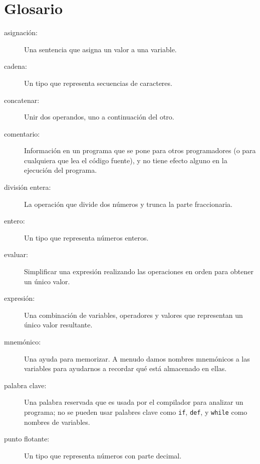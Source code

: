 

\section{Glosario}

\begin{description}

\item[asignación:]  Una sentencia que asigna un valor a una variable.

\item[cadena:] Un tipo que representa secuencias de caracteres.

\item[concatenar:]  Unir dos operandos, uno a continuación del otro.

\item[comentario:]  Información en un programa que se pone para otros
programadores (o para cualquiera que lea el código fuente), y no tiene efecto alguno
en la ejecución del programa.

\item[división entera:] La operación que divide dos números y trunca la
parte fraccionaria.

\item[entero:] Un tipo que representa números enteros.

\item[evaluar:]  Simplificar una expresión realizando las operaciones
en orden para obtener un único valor.

\item[expresión:]  Una combinación de variables, operadores y valores que
representan un único valor resultante.

\item[mnemónico:] Una ayuda para memorizar. A menudo damos nombres mnemónicos a las variables
para ayudarnos a recordar qué está almacenado en ellas.

\item[palabra clave:]  Una palabra reservada que es usada por el compilador para analizar un
programa; no se pueden usar palabres clave como {\tt if}, {\tt  def}, y {\tt while} como
nombres de variables.

\item[punto flotante:] Un tipo que representa números con parte
decimal.


\end{description}
